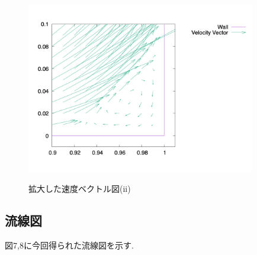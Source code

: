 \documentclass[upLaTeX,a4paper]{jsarticle}
\begin{document}
{\begin{figure}[H]
\begin{minipage}[c]{0.45\linewidth}
    \label{ラベル1}
  \end{minipage}
  \begin{minipage}[c]{0.45\linewidth}
    \centering
    \includegraphics[height=7.5cm]{outputs/img/velocity_vector_corner2_re200.png}
    \label{ラベル2}
  \end{minipage}
  \caption{拡大した速度ベクトル図(ii)}\label{ラベル}
\end{figure}
}


\subsection{流線図}

図7,8に今回得られた流線図を示す.
\end{document}
